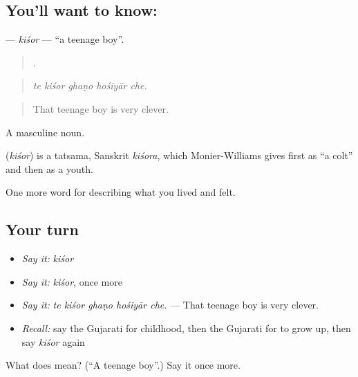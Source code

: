 \subsection*{You'll want to know: }
\textbf{} — \emph{kiśor} — \textquotedblleft{}a teenage boy\textquotedblright{}.

\begin{quote}
    .
\end{quote}

\begin{quote}
\emph{te kiśor ghaṇo hośiyār che.}
\end{quote}

\begin{quote}
That teenage boy is very clever.
\end{quote}

A masculine noun.

\begin{cousinweb}
\textbf{} (\emph{kiśor}) is a tatsama, Sanskrit \emph{kiśora}, which Monier-Williams gives first as \textquotedblleft{}a colt\textquotedblright{} and then as a youth.
\end{cousinweb}

\begin{grammarlens}[title={What you've built}]
One more word for describing what you lived and felt.
\end{grammarlens}

\subsection*{Your turn}
\begin{itemize}
\raggedright
  \item \emph{Say it:} \emph{kiśor}
  \item \emph{Say it:} \emph{kiśor}, once more
  \item \emph{Say it:} \emph{te kiśor ghaṇo hośiyār che.} — That teenage boy is very clever.
  \item \emph{Recall:} say the Gujarati for childhood, then the Gujarati for to grow up, then say \emph{kiśor} again
\end{itemize}

\begin{tcolorbox}[breakable,colback=teal!4,colframe=teal!35!black,title={Before you move on}]
What does  mean? (\textquotedblleft{}A teenage boy\textquotedblright{}.) Say it once more.
\end{tcolorbox}
